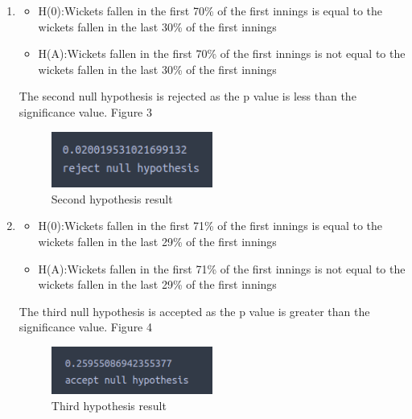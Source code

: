 \documentclass[fleqn,10pt]{wlscirep}
\begin{document}
\begin{enumerate}
\item
\begin{itemize}
    \item H(0):Wickets fallen in the first 70\% of the first innings is equal to the wickets fallen in the last 30\% of the first innings
    \item H(A):Wickets fallen in the first 70\% of the first innings is not equal to the wickets fallen in the last 30\% of the first innings
\end{itemize}
The second null hypothesis is rejected as the p value is less than the significance value. Figure 3
\begin{figure}[h!]
    \centering
    \includegraphics[width=0.5\textwidth]{secondone.png}
    \caption{Second hypothesis result}
  \end{figure}

\item
\begin{itemize}
    \item H(0):Wickets fallen in the first 71\% of the first innings is equal to the wickets fallen in the last 29\% of the first innings
    \item H(A):Wickets fallen in the first 71\% of the first innings is not equal to the wickets fallen in the last 29\% of the first innings
\end{itemize}
The third null hypothesis is accepted as the p value is greater than the significance value. Figure 4
\begin{figure}[h!]
    \centering
    \includegraphics[width=0.5\textwidth]{secondsecond.png}
    \caption{Third hypothesis result}
  \end{figure}


\end{enumerate}
\end{document}
